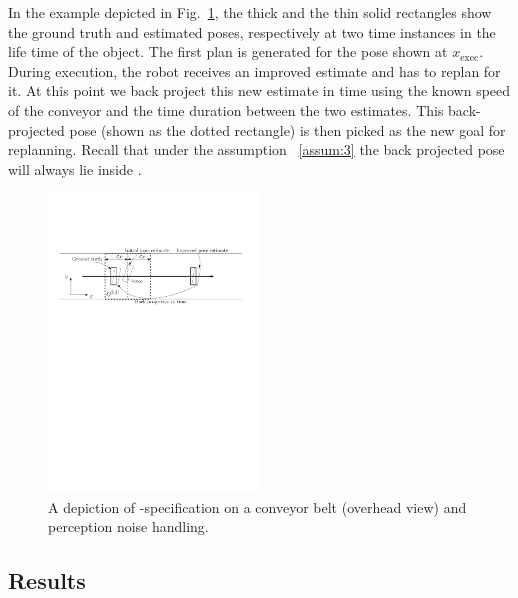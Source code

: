 \documentclass[conference]{IEEEtran}
\begin{document}
In the example depicted in Fig.~\ref{fig:pe}, the thick and the thin solid rectangles show the ground truth and estimated poses, respectively at two time instances in the life time of the object.
%
The first plan is generated for the pose shown at $x_{\textrm{exec}}$. During execution, the robot receives an improved estimate and has to replan for it. At this point we back project this new estimate in time using the known speed of the conveyor and the time duration between the two estimates. This back-projected pose (shown as the dotted rectangle) is then picked as the new goal for replanning. Recall that under the assumption ~\ref{assum:3} the back projected pose will always lie inside \Gfull.
%



\begin{figure}
    \centering
    \includegraphics[width=0.5\textwidth]{figs/pose_error2.pdf}
    \caption{\CaptionTextSize A depiction of \Gfull-specification on a conveyor belt (overhead view) and perception noise handling. 
    }
    \label{fig:pe}
\end{figure}

\subsection{Results}
\end{document}

